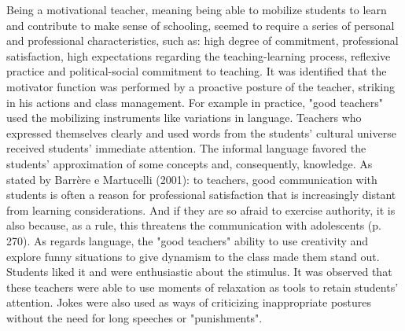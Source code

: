 \documentclass[11pt, a4paper]{article}
\begin{document}
Being a motivational teacher, meaning being able to mobilize students to learn and contribute to make sense of schooling,
seemed to require a series of personal and professional characteristics, such as: high degree of commitment, professional
satisfaction, high expectations regarding the teaching-learning process, reflexive practice and political-social
commitment to teaching. It was identified that the motivator function was performed by a proactive posture of the teacher,
striking in his actions and class management. For example in practice, "good teachers" used the mobilizing instruments
like variations in language. Teachers who expressed themselves clearly and used words from the students' cultural
universe received students' immediate attention. The informal language favored the students' approximation of some
concepts and, consequently, knowledge. As stated by Barrère e Martucelli (2001): to teachers, good communication with
students is often a reason for professional satisfaction that is increasingly distant from learning considerations. And if they
are so afraid to exercise authority, it is also because, as a rule, this threatens the communication with adolescents (p. 270).
As regards language, the "good teachers" ability to use creativity and explore funny situations to give dynamism to the
class made them stand out. Students liked it and were enthusiastic about the stimulus. It was observed that these teachers
were able to use moments of relaxation as tools to retain students' attention. Jokes were also used as ways of criticizing
inappropriate postures without the need for long speeches or "punishments".
\end{document}
